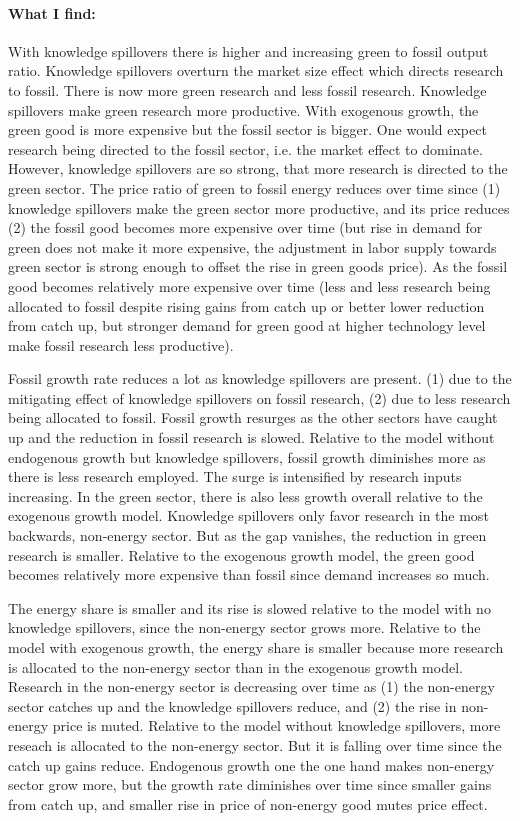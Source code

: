 \documentclass[12pt]{article}
\begin{document}
\paragraph{What I find:} With knowledge spillovers there is higher and increasing green to fossil output ratio. Knowledge spillovers overturn the market size effect which directs research to fossil. There is now more green research and less fossil research. Knowledge spillovers make green research more productive. With exogenous growth, the green good is more expensive but the fossil sector is bigger. One would expect research being directed to the fossil sector, i.e. the market effect to dominate. However, knowledge spillovers are so strong, that more research is directed to the green sector.  The price ratio of green to fossil energy reduces over time since (1) knowledge spillovers make the green sector more productive, and its price reduces (2) the fossil good becomes more expensive over time (but rise in demand for green does not make it more expensive, the adjustment in labor supply towards green sector is strong enough to offset the rise in green goods price). As the fossil good becomes relatively more expensive over time (less and less research being allocated to fossil despite rising gains from catch up or better lower reduction from catch up, but stronger demand for green good at higher technology level make fossil research less productive).

Fossil growth rate reduces a lot as knowledge spillovers are present. (1) due to the mitigating effect of knowledge spillovers on fossil research, (2) due to less research being allocated to fossil. Fossil growth resurges as the other sectors have caught up and the reduction in fossil research is slowed. Relative to the model without endogenous growth but knowledge spillovers, fossil growth diminishes more as there is less research employed. The surge is intensified by research inputs increasing. 
In the green sector, there is also less growth overall relative to the exogenous growth model. Knowledge spillovers only favor research in the most backwards, non-energy sector. But as the gap vanishes, the reduction in green research is smaller. Relative to the exogenous growth model, the green good becomes relatively more expensive than fossil since demand increases so much. 


The energy share is smaller and its rise is slowed relative to the model with no knowledge spillovers, since the non-energy sector grows more. Relative to the model with exogenous growth, the energy share is smaller because more research is allocated to the non-energy sector than in the exogenous growth model. Research in the non-energy sector is decreasing over time as (1) the non-energy sector catches up and the knowledge spillovers reduce, and (2) the rise in non-energy price is muted. Relative to the model without knowledge spillovers, more reseach is allocated to the non-energy sector. But it is falling over time since the catch up gains reduce. 
Endogenous growth one the one hand makes non-energy sector grow more, but the growth rate diminishes over time since smaller gains from catch up, and smaller rise in price of non-energy good mutes price effect. 
\end{document}
